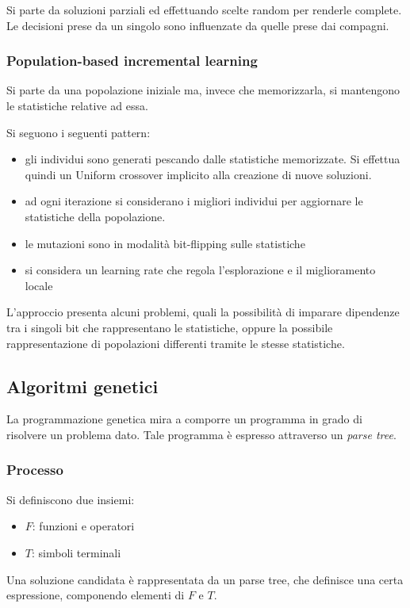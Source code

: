 \documentclass[a4paper]{article}
\begin{document}
Si parte da soluzioni parziali ed effettuando scelte random per 
renderle complete. Le decisioni prese da un singolo 
sono influenzate da quelle prese dai compagni.

\subsubsection{Population-based incremental learning}
Si parte da una popolazione iniziale ma, invece che memorizzarla, 
si mantengono le statistiche relative ad essa.

Si seguono i seguenti pattern:
\begin{itemize}
    \item gli individui sono generati pescando dalle statistiche memorizzate.
    Si effettua quindi un Uniform crossover implicito alla creazione di nuove 
    soluzioni.
    \item ad ogni iterazione si considerano i migliori individui per aggiornare le statistiche
    della popolazione.
    \item le mutazioni sono in modalità bit-flipping sulle statistiche 
    \item si considera un learning rate che regola l'esplorazione e il miglioramento locale
\end{itemize}
L'approccio presenta alcuni problemi, quali la possibilità di imparare dipendenze tra
i singoli bit che rappresentano le statistiche, oppure la possibile rappresentazione 
di popolazioni differenti tramite le stesse statistiche.


\subsection{Algoritmi genetici}
La programmazione genetica mira a comporre un programma in grado 
di risolvere un problema dato.
Tale programma è espresso attraverso un \emph{parse tree}.

\subsubsection{Processo}
Si definiscono due insiemi: 
\begin{itemize}
    \item $F$: funzioni e operatori
    \item $T$: simboli terminali
\end{itemize}

Una soluzione candidata è rappresentata da un parse tree, che definisce
una certa espressione, componendo elementi di $F$ e $T$.
\end{document}
